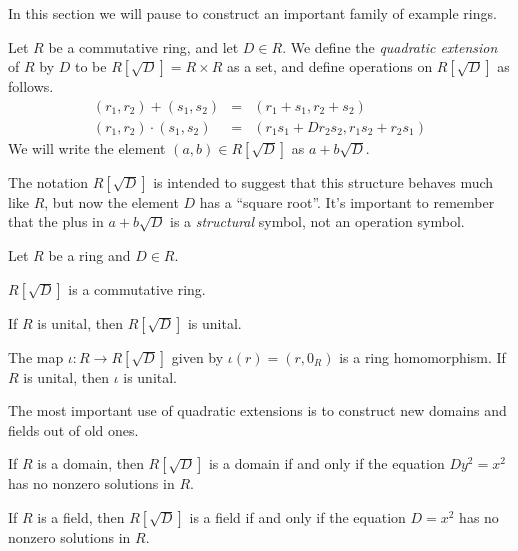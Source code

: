 In this section we will pause to construct an important family of example rings. 

\begin{dfn}
Let \(R\) be a commutative ring, and let \(D \in R\). We define the \emph{quadratic extension}  of \(R\) by \(D\) to be \(R[\sqrt{D}] = R \times R\) as a set, and define operations on \(R[\sqrt{D}]\) as follows.
\begin{eqnarray*}
(r_1,r_2) + (s_1,s_2) & = & (r_1+s_1, r_2+s_2) \\
(r_1,r_2) \cdot (s_1,s_2) & = & (r_1s_1 + Dr_2s_2, r_1s_2 + r_2s_1)
\end{eqnarray*}
We will write the element \((a,b) \in R[\sqrt{D}]\) as \(a + b\sqrt{D}\).
\end{dfn}

The notation \(R[\sqrt{D}]\) is intended to suggest that this structure behaves much like \(R\), but now the element \(D\) has a ``square root''. It's important to remember that the plus in \(a + b\sqrt{D}\) is a \emph{structural} symbol, not an operation symbol.

\begin{prop} \label{prop:quad-ext-ring}
Let \(R\) be a ring and \(D \in R\).
\begin{proplist*}
\item \(R[\sqrt{D}]\) is a commutative ring.
\item If \(R\) is unital, then \(R[\sqrt{D}]\) is unital.
\item The map \(\iota : R \rightarrow R[\sqrt{D}]\) given by \(\iota(r) = (r,0_R)\) is a ring homomorphism. If \(R\) is unital, then \(\iota\) is unital.
\end{proplist*}
\end{prop}

The most important use of quadratic extensions is to construct new domains and fields out of old ones.

\begin{prop} \label{prop:quad-ext-dom} \mbox{}
\begin{proplist}
\item If \(R\) is a domain, then \(R[\sqrt{D}]\) is a domain if and only if the equation \(Dy^2 = x^2\) has no nonzero solutions in \(R\).
\item If \(R\) is a field, then \(R[\sqrt{D}]\) is a field if and only if the equation \(D = x^2\) has no nonzero solutions in \(R\).
\end{proplist}
\end{prop}

